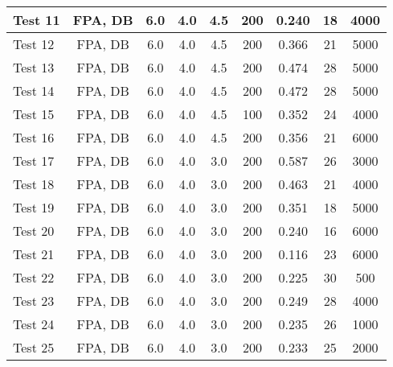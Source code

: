 \begin{table}[!h]
\begin{center}
\begin{tabular}{|l|c|c|c|c|c|c|c|c|}
Test 11    &  FPA, DB           &  6.0       &  4.0       &  4.5       &  200            &  0.240          &  18                &  4000            \\ \hline
Test 12    &  FPA, DB           &  6.0       &  4.0       &  4.5       &  200            &  0.366          &  21                &  5000            \\ \hline
Test 13    &  FPA, DB           &  6.0       &  4.0       &  4.5       &  200            &  0.474          &  28                &  5000            \\ \hline
Test 14    &  FPA, DB           &  6.0       &  4.0       &  4.5       &  200            &  0.472          &  28                &  5000            \\ \hline
Test 15    &  FPA, DB           &  6.0       &  4.0       &  4.5       &  100            &  0.352          &  24                &  4000            \\ \hline
Test 16    &  FPA, DB           &  6.0       &  4.0       &  4.5       &  200            &  0.356          &  21                &  6000            \\ \hline
Test 17    &  FPA, DB           &  6.0       &  4.0       &  3.0       &  200            &  0.587          &  26                &  3000            \\ \hline
Test 18    &  FPA, DB           &  6.0       &  4.0       &  3.0       &  200            &  0.463          &  21                &  4000            \\ \hline
Test 19    &  FPA, DB           &  6.0       &  4.0       &  3.0       &  200            &  0.351          &  18                &  5000            \\ \hline
Test 20    &  FPA, DB           &  6.0       &  4.0       &  3.0       &  200            &  0.240          &  16                &  6000            \\ \hline
Test 21    &  FPA, DB           &  6.0       &  4.0       &  3.0       &  200            &  0.116          &  23                &  6000            \\ \hline
Test 22    &  FPA, DB           &  6.0       &  4.0       &  3.0       &  200            &  0.225          &  30                &  500             \\ \hline
Test 23    &  FPA, DB           &  6.0       &  4.0       &  3.0       &  200            &  0.249          &  28                &  4000            \\ \hline
Test 24    &  FPA, DB           &  6.0       &  4.0       &  3.0       &  200            &  0.235          &  26                &  1000            \\ \hline
Test 25    &  FPA, DB           &  6.0       &  4.0       &  3.0       &  200            &  0.233          &  25                &  2000            \\ \hline
\end{tabular}
\end{center}
\end{table}

